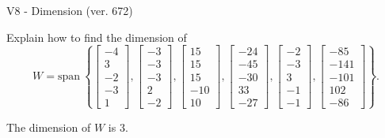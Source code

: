 \begin{exercise}
  \begin{exerciseTitle}V8 - Dimension (ver. 672)\end{exerciseTitle}
  \begin{exerciseStatement}
    Explain how to find the dimension of 
\[W=\mathrm{span}\ \left\{\left[\begin{array}{r}
-4 \\
3 \\
-2 \\
-3 \\
1
\end{array}\right] , \left[\begin{array}{r}
-3 \\
-3 \\
-3 \\
2 \\
-2
\end{array}\right] , \left[\begin{array}{r}
15 \\
15 \\
15 \\
-10 \\
10
\end{array}\right] , \left[\begin{array}{r}
-24 \\
-45 \\
-30 \\
33 \\
-27
\end{array}\right] , \left[\begin{array}{r}
-2 \\
-3 \\
3 \\
-1 \\
-1
\end{array}\right] , \left[\begin{array}{r}
-85 \\
-141 \\
-101 \\
102 \\
-86
\end{array}\right]\right\}.\]



  \end{exerciseStatement}
  \begin{exerciseAnswer}
   The dimension of \(W\) is  \(3\).
  


  \end{exerciseAnswer}
\end{exercise}
